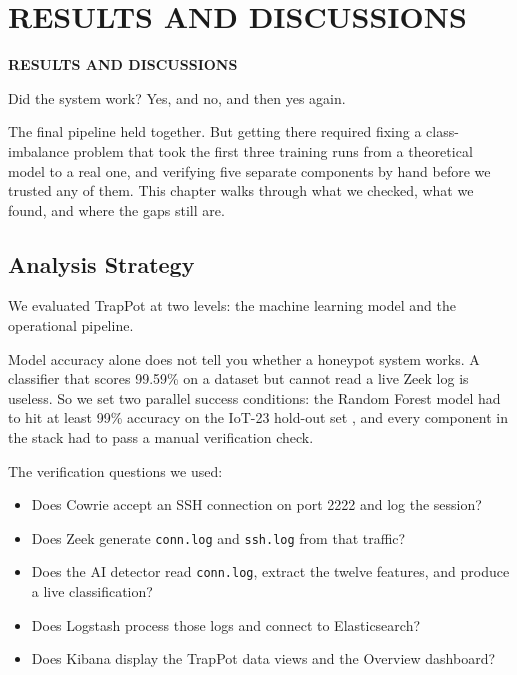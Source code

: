 \chapter{RESULTS AND DISCUSSIONS}
\pagebreak

\begin{center}
{\LARGE\textbf{RESULTS AND DISCUSSIONS}}
\end{center}


Did the system work? Yes, and no, and then yes again.

The final pipeline held together. But getting there required fixing a class-imbalance problem that took the first three training runs from a theoretical model to a real one, and verifying five separate components by hand before we trusted any of them. This chapter walks through what we checked, what we found, and where the gaps still are.

\section{Analysis Strategy}
\label{sec:analysis_strategy}

We evaluated TrapPot at two levels: the machine learning model and the operational pipeline.

Model accuracy alone does not tell you whether a honeypot system works. A classifier that scores 99.59\% on a dataset but cannot read a live Zeek log is useless. So we set two parallel success conditions: the Random Forest model had to hit at least 99\% accuracy on the IoT-23 hold-out set \cite{iot23dataset,karim2024efficient}, and every component in the stack had to pass a manual verification check.

The verification questions we used:

\begin{itemize}
\item Does Cowrie accept an SSH connection on port 2222 and log the session?
\item Does Zeek generate \texttt{conn.log} and \texttt{ssh.log} from that traffic?
\item Does the AI detector read \texttt{conn.log}, extract the twelve features, and produce a live classification?
\item Does Logstash process those logs and connect to Elasticsearch?
\item Does Kibana display the TrapPot data views and the Overview dashboard?
\end{itemize}

